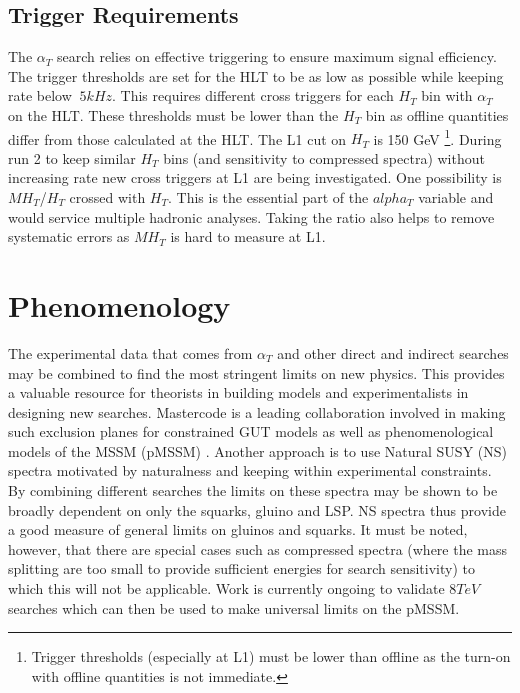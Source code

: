 \subsection{Trigger Requirements}
The $\alpha_T$ search relies on effective triggering to ensure maximum signal efficiency. The trigger thresholds are set for the HLT to be as low as possible while keeping rate below $~5kHz$. This requires different cross triggers for each $H_T$ bin with $\alpha_T$ on the HLT. These thresholds must be lower than the $H_T$ bin as offline quantities differ from those calculated at the HLT. The L1 cut on $H_T$ is 150 GeV \footnote{Trigger thresholds (especially at L1) must be lower than offline as the turn-on with offline quantities is not immediate.}. During run 2 to keep similar $H_T$ bins (and sensitivity to compressed spectra) without increasing rate new cross triggers at L1 are being investigated. One possibility is $MH_T$/$H_T$ crossed with $H_T$. This is the essential part of the $alpha_T$ variable and would service multiple hadronic analyses. Taking the ratio also helps to remove systematic errors as $MH_T$ is hard to measure at L1. 
\section{Phenomenology}
The experimental data that comes from $\alpha_T$ and other direct and indirect searches may be combined to find the most stringent limits on new physics. This provides a valuable resource for theorists in building models and experimentalists in designing new searches. Mastercode is a leading collaboration involved in making such exclusion planes for constrained GUT models as well as phenomenological models of the MSSM (pMSSM) \cite{mcode} . Another approach is to use Natural SUSY (NS) spectra motivated by naturalness and keeping within experimental constraints\cite{joliver}. By combining different searches the limits on these spectra may be shown to be broadly dependent on only the squarks, gluino and LSP. NS spectra thus provide a good measure of general limits on gluinos and squarks. It must be noted, however, that there are special cases such as compressed spectra (where the mass splitting are too small to provide sufficient energies for search sensitivity) to which this will not be applicable. Work is currently ongoing to validate $8TeV$ searches which can then be used to make universal limits on the pMSSM.


